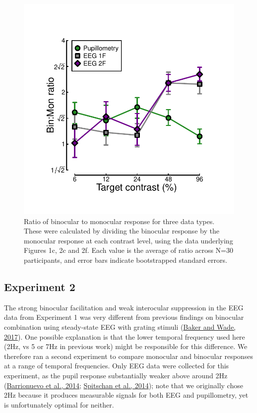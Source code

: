 \documentclass[
]{article}
\begin{document}
\begin{figure}

{\centering \includegraphics[width=0.5\linewidth]{Figures/BSratios} 

}

\caption{Ratio of binocular to monocular response for three data types. These were calculated by dividing the binocular response by the monocular response at each contrast level, using the data underlying Figures 1c, 2c and 2f. Each value is the average of ratio across N=30 participants, and error bars indicate bootstrapped standard errors.}\label{fig:BSratios}
\end{figure}

\hypertarget{experiment-2}{%
\subsection{Experiment 2}\label{experiment-2}}

The strong binocular facilitation and weak interocular suppression in the EEG data from Experiment 1 was very different from previous findings on binocular combination using steady-state EEG with grating stimuli (\protect\hyperlink{ref-Baker2017}{Baker and Wade, 2017}). One possible explanation is that the lower temporal frequency used here (2Hz, vs 5 or 7Hz in previous work) might be responsible for this difference. We therefore ran a second experiment to compare monocular and binocular responses at a range of temporal frequencies. Only EEG data were collected for this experiment, as the pupil response substantially weaker above around 2Hz (\protect\hyperlink{ref-Barrionuevo2014}{Barrionuevo et al., 2014}; \protect\hyperlink{ref-Spitschan2014}{Spitschan et al., 2014}); note that we originally chose 2Hz because it produces measurable signals for both EEG and pupillometry, yet is unfortunately optimal for neither.
\end{document}
